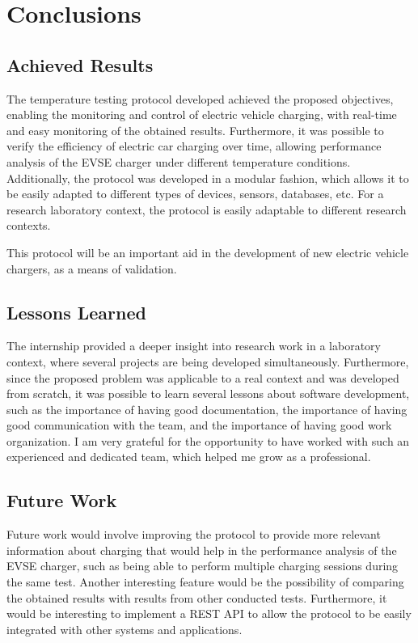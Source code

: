 \section{Conclusions}


\subsection{Achieved Results} 	
The temperature testing protocol developed achieved the proposed objectives, enabling the monitoring and control of 
electric vehicle charging, with real-time and easy monitoring of the obtained results. Furthermore, it was possible to verify the 
efficiency of electric car charging over time, allowing performance analysis of the EVSE charger under different temperature 
conditions.
Additionally, the protocol was developed in a modular fashion, which allows it to be easily adapted to different types of devices,
sensors, databases, etc. For a research laboratory context, the protocol is easily adaptable to different 
research contexts. 

This protocol will be an important aid in the development of new electric vehicle chargers, as a means of validation.


\subsection{Lessons Learned} 	
The internship provided a deeper insight into research work in a laboratory context, where several projects
are being developed simultaneously. Furthermore, since the proposed problem was applicable to a real context and was 
developed from scratch, it was possible to learn several lessons about software development, such as the importance of having good
documentation, the importance of having good communication with the team, and the importance of having good work organization.
I am very grateful for the opportunity to have worked with such an experienced and dedicated team, which helped me 
grow as a professional. 
	
\subsection{Future Work} 
Future work would involve improving the protocol to provide more relevant information about charging
that would help in the performance analysis of the EVSE charger, such as being able to perform multiple charging 
sessions during the same test. 
Another interesting feature would be the possibility of comparing the obtained results with results from other conducted tests.
Furthermore, it would be interesting to implement a REST API to allow the protocol to be easily integrated with other systems and applications.
	
